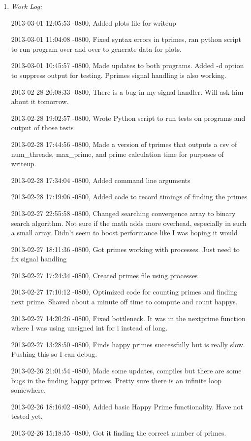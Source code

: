 \documentclass[letterpaper,10pt,titlepage]{article}
\begin{document}
\begin{enumerate}
\item \emph{Work Log:}

2013-03-01 12:05:53 -0800, Added plots file for writeup

2013-03-01 11:04:08 -0800, Fixed syntax errors in tprimes, ran python script to run program over and over to generate data for plots.

2013-03-01 10:45:57 -0800, Made updates to both programs. Added -d option to suppress output for testing. Pprimes signal handling is also working.

2013-02-28 20:08:33 -0800, There is a bug in my signal handler. Will ask him about it tomorrow.

2013-02-28 19:02:57 -0800, Wrote Python script to run tests on programs and output of those tests

2013-02-28 17:44:56 -0800, Made a version of tprimes that outputs a csv of num\_threads, max\_prime, and prime calculation time for purposes of writeup.

2013-02-28 17:34:04 -0800, Added command line arguments

2013-02-28 17:19:06 -0800, Added code to record timings of finding the primes

2013-02-27 22:55:58 -0800, Changed searching convergence array to binary search algorithm. Not sure if the math adds more overhead, especially in such a small array. Didn't seem to boost performance like I was hoping it would

2013-02-27 18:11:36 -0800, Got primes working with processes. Just need to fix signal handling

2013-02-27 17:24:34 -0800, Created primes file using processes

2013-02-27 17:10:12 -0800, Optimized code for counting primes and finding next prime. Shaved about a minute off time to compute and count happys.

2013-02-27 14:20:26 -0800, Fixed bottleneck. It was in the nextprime function where I was using unsigned int for i instead of long.

2013-02-27 13:28:50 -0800, Finds happy primes successfully but is really slow. Pushing this so I can debug.

2013-02-26 21:01:54 -0800, Made some updates, compiles but there are some bugs in the finding happy primes. Pretty sure there is an infinite loop somewhere.

2013-02-26 18:16:02 -0800, Added basic Happy Prime functionality. Have not tested yet.

2013-02-26 15:18:55 -0800, Got it finding the correct number of primes.


\end{enumerate}
\end{document}

